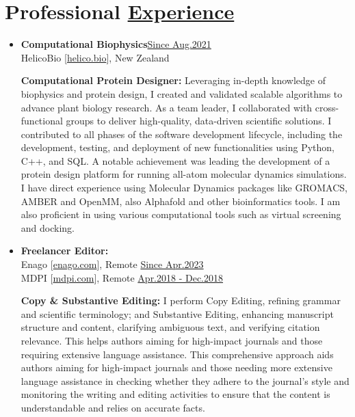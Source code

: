 
\section{Professional \href{.}{Experience}}

\begin{itemize}


    \item {\bf Computational Biophysics}\hfill \href{.}{Since Aug.2021}\\
          HelicoBio [\href{www.helico.bio}{helico.bio}],
          New Zealand

              {\noindent
                  \textbf{Computational Protein Designer:}
                  Leveraging in-depth knowledge of biophysics and protein design, I created and validated scalable algorithms to advance plant biology research. As a team leader, I collaborated with cross-functional groups to deliver high-quality, data-driven scientific solutions. I contributed to all phases of the software development lifecycle, including the development, testing, and deployment of new functionalities using Python, C++, and SQL. A notable achievement was leading the development of a protein design platform for running all-atom molecular dynamics simulations. I have direct experience using Molecular Dynamics packages like GROMACS, AMBER and OpenMM, also Alphafold and other bioinformatics tools. I am also proficient in using various computational tools such as virtual screening and docking.
              }

    \item {\bf Freelancer Editor:}\\
          Enago [\href{https://www.enago.com/}{enago.com}], Remote \hfill
          \href{.}{Since Apr.2023}\\
          MDPI [\href{https://www.mdpi.com/}{mdpi.com}], Remote \hfill
          \href{.}{Apr.2018 - Dec.2018}

          {\noindent
              \textbf{Copy \& Substantive Editing:}
              I perform Copy Editing, refining grammar and scientific terminology; and Substantive Editing, enhancing manuscript structure and content, clarifying ambiguous text, and verifying citation relevance. This helps authors aiming for high-impact journals and those requiring extensive language assistance. This comprehensive approach aids authors aiming for high-impact journals and those needing more extensive language assistance in checking whether they adhere to the journal's style and monitoring the writing and editing activities to ensure that the content is understandable and relies on accurate facts.
          }


\end{itemize}
